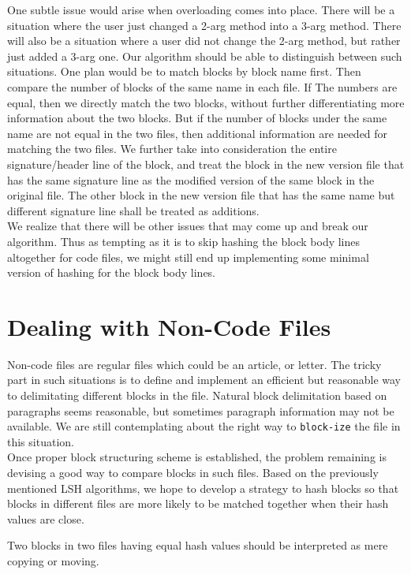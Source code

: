 \documentclass{article}
\begin{document}
One subtle issue would arise when overloading comes into place. There will be a situation where the user just changed a 2-arg method into a 3-arg method. There will also be a situation where a user did not change the 2-arg method, but rather just added a 3-arg one. Our algorithm should be able to distinguish between such situations. One plan would be to match blocks by block name first. Then compare the number of blocks of the same name in each file. If The numbers are equal, then we directly match the two blocks, without further differentiating more information about the two blocks. But if the number of blocks under the same name are not equal in the two files, then additional information are needed for matching the two files. We further take into consideration the entire signature/header line of the block, and treat the block in the new version file that has the same signature line as the modified version of the same block in the original file. The other block in the new version file that has the same name but different signature line shall be treated as additions.\\

We realize that there will be other issues that may come up and break our algorithm. Thus as tempting as it is to skip hashing the block body lines altogether for code files, we might still end up implementing some minimal version of hashing for the block body lines. 

\section{Dealing with Non-Code Files}
Non-code files are regular files which could be an article, or letter. The tricky part in such situations is to define and implement an efficient but reasonable way to delimitating different blocks in the file. Natural block delimitation based on paragraphs seems reasonable, but sometimes paragraph information may not be available. We are still contemplating about the right way to \texttt{block-ize} the file in this situation.\\

Once proper block structuring scheme is established, the problem remaining is devising a good way to compare blocks in such files.
Based on the previously mentioned LSH algorithms, we hope to develop a strategy to hash blocks so that blocks in different files are more likely to be matched together when their hash values are close.

Two blocks in two files having equal hash values should be interpreted as mere copying or moving. 
\end{document}

